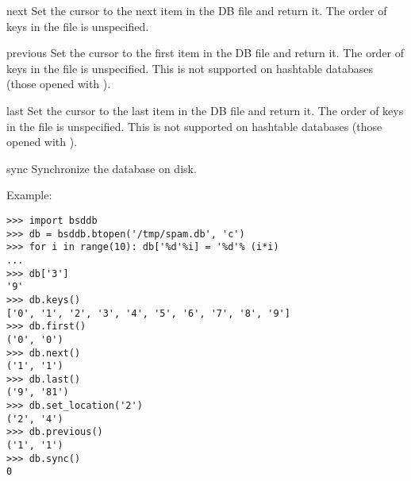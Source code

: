 \begin{methoddesc}{next}{}
Set the cursor to the next item in the DB file and return it.  The order of 
keys in the file is unspecified.
\end{methoddesc}

\begin{methoddesc}{previous}{}
Set the cursor to the first item in the DB file and return it.  The
order of keys in the file is unspecified.  This is not supported on
hashtable databases (those opened with ).
\end{methoddesc}

\begin{methoddesc}{last}{}
Set the cursor to the last item in the DB file and return it.  The
order of keys in the file is unspecified.  This is not supported on
hashtable databases (those opened with ).
\end{methoddesc}

\begin{methoddesc}{sync}{}
Synchronize the database on disk.
\end{methoddesc}

Example:

\begin{verbatim}
>>> import bsddb
>>> db = bsddb.btopen('/tmp/spam.db', 'c')
>>> for i in range(10): db['%d'%i] = '%d'% (i*i)
... 
>>> db['3']
'9'
>>> db.keys()
['0', '1', '2', '3', '4', '5', '6', '7', '8', '9']
>>> db.first()
('0', '0')
>>> db.next()
('1', '1')
>>> db.last()
('9', '81')
>>> db.set_location('2')
('2', '4')
>>> db.previous() 
('1', '1')
>>> db.sync()
0
\end{verbatim}
